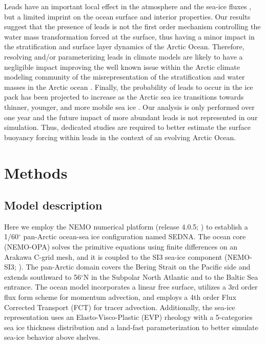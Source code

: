 \documentclass[lineno,sn-basic]{sn-jnl}%
\begin{document}
Leads have an important local effect in the atmosphere and the sea-ice fluxes \citep{Lupkes_leads_2008,Marcq_flux_lead_2012, Wettlaufer_insulator_1997, Smith_polynyas_1990}, but a limited imprint on the ocean surface and interior properties. Our results suggest that the presence of leads is not the first order mechanism controlling the water mass transformation forced at the surface, thus having a minor impact in the stratification and surface layer dynamics of the Arctic Ocean.
Therefore, resolving and/or parameterizing leads in climate models are likely to have a negligible impact improving the well known issue within the Arctic climate modeling community of the misrepresentation of the stratification and water masses in the Arctic ocean \citep{Wang_ompi_2024,Ilicak_core_2016}. Finally, the probability of leads to occur in the ice pack has been projected to increase as the Arctic sea ice transitions towards thinner, younger, and more mobile sea ice \citep{Boutin_rheology_2023, IPCC_arctic_2022}. Our analysis is only performed over one year and the future impact of more abundant leads is not represented in our simulation. Thus, dedicated studies are required to better estimate the surface buoyancy forcing within leads in the context of an evolving Arctic Ocean.  

\section{Methods}
\subsection*{Model description}

Here we employ the NEMO numerical platform (release 4.0.5; \citealp{NEMO_man}) to establish a 1/60$^\circ$ pan-Arctic ocean-sea ice configuration named SEDNA. The ocean core (NEMO-OPA) solves the primitive equations using finite differences on an Arakawa C-grid mesh, and it is coupled to the SI3 sea-ice component (NEMO-SI3; \citealp{SI3_man}). The pan-Arctic domain covers the Bering Strait on the Pacific side and extends southward to 56$^\circ$N in the Subpolar North Atlantic and to the Baltic Sea entrance. The ocean model incorporates a linear free surface, utilizes a 3rd order flux form scheme for momentum advection, and employs a 4th order Flux Corrected Transport (FCT) for tracer advection. Additionally, the sea-ice representation uses an Elasto-Visco-Plastic (EVP) rheology with a 5-categories sea ice thickness distribution and a land-fast parameterization to better simulate sea-ice behavior above shelves.
\end{document}
